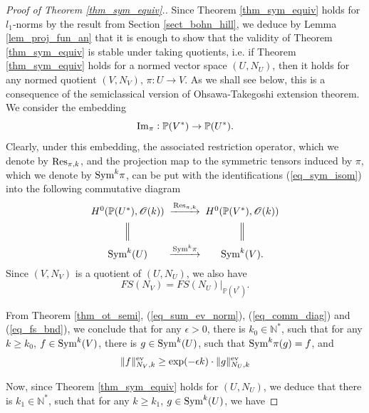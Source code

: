 \documentclass[12pt]{article}
\numberwithin{equation}{section}
\theoremstyle{theorem}
\theoremstyle{definition}
\theoremstyle{remark}
\newcommand{\res}{{\rm{Res}}}
\newcommand{\sym}{{\rm{Sym}}}
\newcommand{\nat}{\mathbb{N}}
\begin{document}
	\begin{proof}[Proof of Theorem \ref{thm_sym_equiv}.]
		Since Theorem \ref{thm_sym_equiv} holds for $\textit{l}_1$-norms by the result from Section \ref{sect_bohn_hill}, we deduce by Lemma \ref{lem_proj_fun_an} that it is enough to show that the validity of Theorem \ref{thm_sym_equiv} is stable under taking quotients, i.e. if Theorem \ref{thm_sym_equiv} holds for a normed vector space $(U, N_U)$, then it holds for any normed quotient $(V, N_V)$, $\pi : U \to V$.
		As we shall see below, this is a consequence of the semiclassical version of Ohsawa-Takegoshi extension theorem.
		We consider the embedding 
		\begin{equation}
			{\rm{Im}}_{\pi} : \mathbb{P}(V^*) \to \mathbb{P}(U^*).
		\end{equation}
		Clearly, under this embedding, the associated restriction operator, which we denote by $\res_{\pi, k}$, and the projection map to the symmetric tensors induced by $\pi$, which we denote by $\sym^k \pi$, can be put with the identifications (\ref{eq_sym_isom}) into the following commutative diagram 
		\begin{equation}\label{eq_comm_diag}
		\begin{CD}
			H^0(\mathbb{P}(U^*), \mathscr{O}(k))  @> \res_{\pi, k} >> H^0(\mathbb{P}(V^*), \mathscr{O}(k)) 
			\\
			@| {}  @| {} 
			\\
			\sym^k(U)  @> \sym^k \pi >> \sym^k(V).
		\end{CD}
		\end{equation}
		Since $(V, N_V)$ is a quotient of $(U, N_U)$, we also have 
		\begin{equation}\label{eq_fs_bnd}
			FS(N_V) = FS(N_U)|_{\mathbb{P}(V^*)}.
		\end{equation}
		\par 
		From Theorem \ref{thm_ot_semi}, (\ref{eq_sum_ev_norm}), (\ref{eq_comm_diag}) and (\ref{eq_fs_bnd}), we conclude that for any $\epsilon > 0$, there is $k_0 \in \nat^*$, such that for any $k \geq k_0$, $f \in \sym^k(V)$, there is $g \in \sym^k(U)$, such that $\sym^k \pi(g) = f$, and
		\begin{equation}\label{eq_fin_1}
			\| f \|^{{\rm{ev}}}_{N_V, k}
			\geq
			\exp(- \epsilon k)
			\cdot
			\| g \|^{{\rm{ev}}}_{N_U, k}
		\end{equation}
		\par 
		Now, since Theorem \ref{thm_sym_equiv} holds for $(U, N_U)$, we deduce that there is $k_1 \in \nat^*$, such that for any $k \geq k_1$, $g \in \sym^k(U)$, we have

\end{proof}
\end{document}
